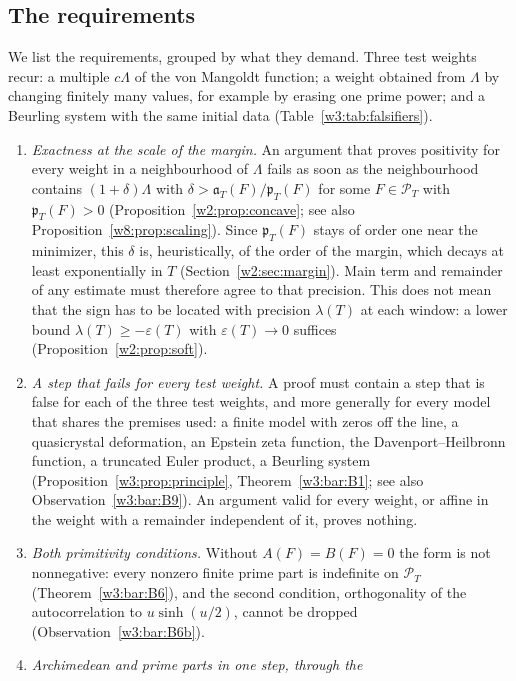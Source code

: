 \documentclass[11pt]{amsart}
\theoremstyle{definition}
\theoremstyle{remark}
\numberwithin{equation}{section}
\newcommand{\PT}{\mathcal{P}_T}                        %
\newcommand{\pT}{\mathfrak{p}_T}                       %
\newcommand{\aT}{\mathfrak{a}_T}                       %
\newcommand{\lam}{\lambda(T)}                          %
\begin{document}
\subsection{The requirements}

We list the requirements, grouped by what they demand. Three test weights recur: a multiple $c\Lambda$ of the
von Mangoldt function; a weight obtained from $\Lambda$ by changing finitely many values, for example by erasing
one prime power; and a Beurling system with the same initial data (Table~\ref{w3:tab:falsifiers}).

\begin{enumerate}[label=(\arabic*),leftmargin=*]
\item\label{w8:con:exact} \emph{Exactness at the scale of the margin.} An argument that proves positivity for
every weight in a neighbourhood of $\Lambda$ fails as soon as the neighbourhood contains $(1+\delta)\Lambda$ with
$\delta>\aT(F)/\pT(F)$ for some $F\in\PT$ with $\pT(F)>0$ (Proposition~\ref{w2:prop:concave}; see also
Proposition~\ref{w8:prop:scaling}). Since $\pT(F)$ stays of order one near the minimizer, this $\delta$ is,
heuristically, of the order of the margin, which decays at least exponentially in $T$
(Section~\ref{w2:sec:margin}). Main term and remainder of any estimate must therefore agree to that precision.
This does not mean that the sign has to be located with precision $\lam$ at each window: a lower bound
$\lam\ge-\varepsilon(T)$ with $\varepsilon(T)\to0$ suffices (Proposition~\ref{w2:prop:soft}).
\item\label{w8:con:controls}\label{w8:con:separate} \emph{A step that fails for every test weight.} A proof must
contain a step that is false for each of the three test weights, and more generally for every model that shares
the premises used: a finite model with zeros off the line, a quasicrystal deformation, an Epstein zeta function,
the Davenport--Heilbronn function, a truncated Euler product, a Beurling system
(Proposition~\ref{w3:prop:principle}, Theorem~\ref{w3:bar:B1}; see also Observation~\ref{w3:bar:B9}). An argument valid
for every weight, or affine in the weight with a remainder independent of it, proves nothing.
\item\label{w8:con:moments} \emph{Both primitivity conditions.} Without $A(F)=B(F)=0$ the form is not
nonnegative: every nonzero finite prime part is indefinite on $\PT$ (Theorem~\ref{w3:bar:B6}), and the second
condition, orthogonality of the autocorrelation to $u\sinh(u/2)$, cannot be dropped (Observation~\ref{w3:bar:B6b}).
\item\label{w8:con:couple}\label{w8:con:fluct} \emph{Archimedean and prime parts in one step, through the
}
\end{enumerate}
\end{document}
